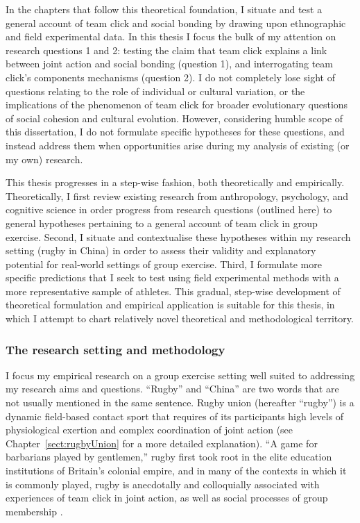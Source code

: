 \begin{CJK}{UTF8}{gbsn}
In the chapters that follow this theoretical foundation, I situate and test a general account of team click and social bonding by drawing upon ethnographic and field experimental data.  In this thesis I focus the bulk of my attention on research questions 1 and 2: testing the claim that team click explains a link between joint action and social bonding (question 1), and interrogating team click's components mechanisms (question 2).  I do not completely lose sight of questions relating to the role of individual or cultural variation, or the implications of the phenomenon of team click for broader evolutionary questions of social cohesion and cultural evolution.  However, considering humble scope of this dissertation, I do not formulate specific hypotheses for these questions, and instead address them when opportunities arise during my analysis of existing (or my own) research.

This thesis progresses in a step-wise fashion, both theoretically and empirically.  Theoretically, I first review existing research from anthropology, psychology, and cognitive science in order progress from research questions (outlined here) to general hypotheses pertaining to a general account of team click in group exercise.  Second, I situate and contextualise these hypotheses within my research setting (rugby in China) in order to assess their validity and explanatory potential for real-world settings of group exercise.  Third, I formulate more specific predictions that I seek to test using field experimental methods with a more representative sample of athletes.  This gradual, step-wise development of theoretical formulation and empirical application is suitable for this thesis, in which I attempt to chart relatively novel theoretical and methodological territory.



\subsubsection{The research setting and methodology}
I focus my empirical research on a group exercise setting well suited to addressing my research aims and questions.  ``Rugby'' and ``China'' are two words that are not usually mentioned in the same sentence.  Rugby union (hereafter ``rugby'') is a dynamic field-based contact sport that requires of its participants high levels of physiological exertion and complex coordination of joint action  (see Chapter~\ref{sect:rugbyUnion} for a more detailed explanation). ``A game for barbarians played by gentlemen,'' rugby first took root in the elite education institutions of Britain's colonial empire, and in many of the contexts in which it is commonly played, rugby is anecdotally and colloquially associated with experiences of team click in joint action, as well as social processes of group membership \citep{Dunning2005}.


\end{CJK}
